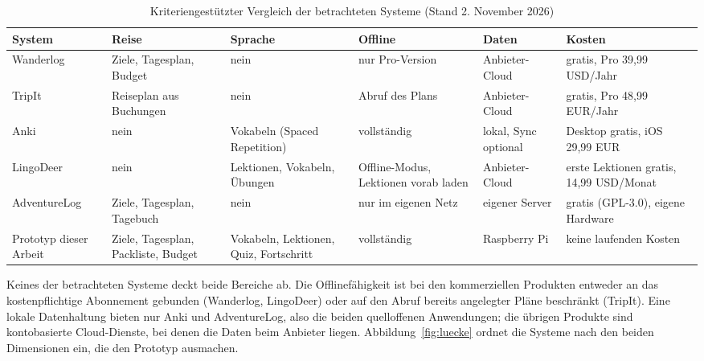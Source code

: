 \documentclass[12pt,a4paper]{scrreprt}
\begin{document}
\begin{table}[!htb]
    \centering
    \small
    \setlength{\tabcolsep}{4pt}
    \begin{tabular}{>{\raggedright\arraybackslash}p{2.4cm}>{\raggedright\arraybackslash}p{2.1cm}>{\raggedright\arraybackslash}p{2.3cm}>{\raggedright\arraybackslash}p{2.3cm}>{\raggedright\arraybackslash}p{2.1cm}>{\raggedright\arraybackslash}p{2.6cm}}
        \toprule
        System & Reise & Sprache & Offline & Daten & Kosten \\
        \midrule
        Wanderlog \cite{wanderlogpro} & Ziele, Tagesplan, Budget & nein & nur Pro-Version & Anbieter-Cloud & gratis, Pro 39,99 USD/Jahr \\
        TripIt \cite{tripitappstore} & Reiseplan aus Buchungen & nein & Abruf des Plans & Anbieter-Cloud & gratis, Pro 48,99 EUR/Jahr \\
        Anki \cite{anki, ankimobile} & nein & Vokabeln (Spaced Repetition) & vollständig & lokal, Sync optional & Desktop gratis, iOS 29,99 EUR \\
        LingoDeer \cite{lingodeerappstore, lingodeerpricing} & nein & Lektionen, Vokabeln, Übungen & Offline-Modus, Lektionen vorab laden & Anbieter-Cloud & erste Lektionen gratis, 14,99 USD/Monat \\
        AdventureLog \cite{adventurelog} & Ziele, Tagesplan, Tagebuch & nein & nur im eigenen Netz & eigener Server & gratis (GPL-3.0), eigene Hardware \\
        \midrule
        Prototyp dieser Arbeit & Ziele, Tagesplan, Packliste, Budget & Vokabeln, Lektionen, Quiz, Fortschritt & vollständig & Raspberry Pi & keine laufenden Kosten \\
        \bottomrule
    \end{tabular}
    \caption{Kriteriengestützter Vergleich der betrachteten Systeme (Stand 2. November 2026)}
    \label{tab:marktvergleich}
\end{table}

Keines der betrachteten Systeme deckt beide Bereiche ab. Die Offlinefähigkeit ist bei den kommerziellen Produkten entweder an das kostenpflichtige Abonnement gebunden (Wanderlog, LingoDeer) oder auf den Abruf bereits angelegter Pläne beschränkt (TripIt). Eine lokale Datenhaltung bieten nur Anki und AdventureLog, also die beiden quelloffenen Anwendungen; die übrigen Produkte sind kontobasierte Cloud-Dienste, bei denen die Daten beim Anbieter liegen. Abbildung~\ref{fig:luecke} ordnet die Systeme nach den beiden Dimensionen ein, die den Prototyp ausmachen.
\end{document}

